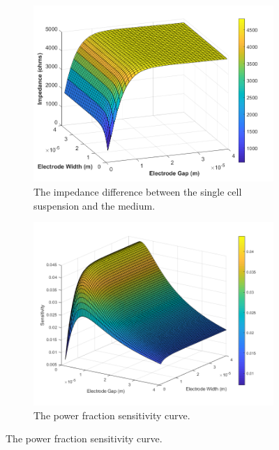 \begin{figure}[h]
    \centering
    \begin{subfigure}[b]{0.49\textwidth}
        \centering
        \includegraphics[width=\textwidth]{images/analytic_sun_difference_expanded.png}
        \caption{The impedance difference between the single cell suspension and the medium.}
        \label{fig:expanded_impedance_difference}
    \end{subfigure}
    \hfill
    \begin{subfigure}[b]{0.49\textwidth}
        \centering
        \includegraphics[width=\textwidth]{images/expandedPowerSensitivity.png}
        \caption{The power fraction sensitivity curve. \\ \vspace{0.15 in}}

\end{subfigure}
\end{figure}
